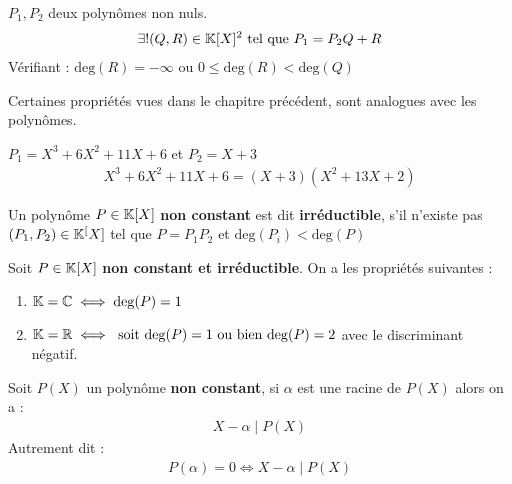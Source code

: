 \begin{graybox}
    \begin{theoreme}
        $P_1, P_2$ deux polynômes non nuls.
        \begin{align*}
            \exists ! (Q, R) \in \mathbb{K}[X]^2 \text{ tel que } P_1 = P_2 Q + R 
        \end{align*}
        Vérifiant :
             $\mathrm{deg}(R) = -\infty$ ou $0 \leq \mathrm{deg}(R) < \mathrm{deg}(Q)$
    \end{theoreme}
\end{graybox}

\begin{remarque}
Certaines propriétés vues dans le chapitre précédent, sont analogues avec les polynômes.
\end{remarque}

\begin{exemple}
$P_1 = X^3 + 6X^2 + 11X + 6$ et $P_2 = X + 3$
\begin{align*}
X^3 + 6X^2 + 11X + 6 = (X+3)(X^2 + 13X + 2)  
\end{align*}
\end{exemple}

\begin{graybox}
\begin{definition}
Un polynôme $P \in \mathbb{K}[X]$ \textbf{non constant} est dit \textbf{irréductible}, s'il n'existe pas $(P_1, P_2) \in \mathbb{K}^[X]$ tel que $P = P_1 P_2$ et $\mathrm{deg}(P_i) < \mathrm{deg}(P)$
\end{definition}
\end{graybox}

\begin{graybox}
\begin{proposition}
Soit $P \in \mathbb{K}[X]$ \textbf{non constant et irréductible}. On a les propriétés suivantes :
\begin{enumerate}
\item $\mathbb{K} = \mathbb{C} \iff \mathrm{deg}(P) = 1$
\item $\mathbb{K} = \mathbb{R} \iff \text{ soit } \mathrm{deg}(P) = 1 \text{ ou bien } \mathrm{deg}(P) = 2$ avec le discriminant négatif.
\end{enumerate}
\end{proposition}
\end{graybox}

\begin{graybox}
\begin{proposition}
Soit $P(X)$ un polynôme \textbf{non constant}, si $\alpha$ est une racine de $P(X)$ alors on a :
\begin{align*}
X - \alpha \mid P(X)
\end{align*}
Autrement dit :
\begin{align*}
P(\alpha) = 0 \iff X - \alpha \mid P(X)
\end{align*}
\end{proposition}
\end{graybox}

